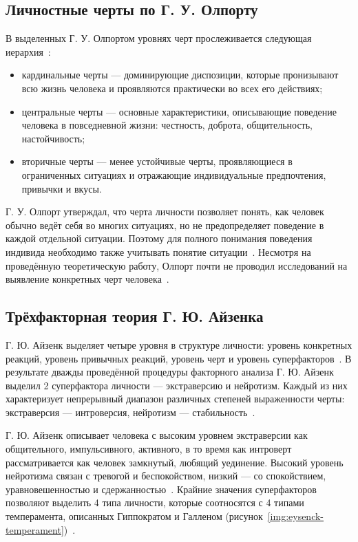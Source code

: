\subsection{Личностные черты по Г. У. Олпорту}

В выделенных Г. У. Олпортом уровнях черт прослеживается следующая иерархия~\cite{PervinJohn2001Personality}:

\begin{itemize}
	\item кардинальные черты --- доминирующие диспозиции, которые пронизывают всю жизнь человека и проявляются практически во всех его действиях;
	\item центральные черты --- основные характеристики, описывающие поведение человека в повседневной жизни: честность, доброта, общительность, настойчивость;
	\item вторичные черты --- менее устойчивые черты, проявляющиеся в ограниченных ситуациях и отражающие индивидуальные предпочтения, привычки и вкусы.
\end{itemize}

Г. У. Олпорт утверждал, что черта личности позволяет понять, как человек обычно ведёт себя во многих ситуациях, но не предопределяет поведение в каждой отдельной ситуации.
Поэтому для полного понимания поведения индивида необходимо также учитывать понятие ситуации~\cite{PervinJohn2001Personality}.
Несмотря на проведённую теоретическую работу, Олпорт почти не проводил исследований на выявление конкретных черт человека~\cite{PervinJohn2001Personality}.

\subsection{Трёхфакторная теория Г. Ю. Айзенка}

Г. Ю. Айзенк выделяет четыре уровня в структуре личности: уровень конкретных реакций, уровень привычных реакций, уровень черт и уровень суперфакторов~\cite{hjellegger-zigler, PervinJohn2001Personality}.
В результате дважды проведённой процедуры факторного анализа Г. Ю. Айзенк выделил 2 суперфактора личности --- экстраверсию и нейротизм.
Каждый из них характеризует непрерывный диапазон различных степеней выраженности черты: экстраверсия --- интроверсия, нейротизм --- стабильность~\cite{theory_of_personality_eysenck}.

Г. Ю. Айзенк описывает человека с высоким уровнем экстраверсии как общительного, импульсивного, активного, в то время как интроверт рассматривается как человек замкнутый, любящий уединение.
Высокий уровень нейротизма связан с тревогой и беспокойством, низкий --- со спокойствием, уравновешенностью и сдержанностью~\cite{theory_of_personality_eysenck}.
Крайние значения суперфакторов позволяют выделить 4 типа личности, которые соотносятся с 4 типами темперамента, описанных Гиппократом и Галленом (рисунок~\ref{img:eysenck-temperament})~\cite{theory_of_personality_eysenck, PervinJohn2001Personality}.

